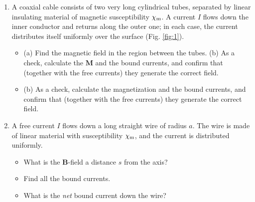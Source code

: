 \documentclass[10pt]{article}
\begin{document}
\begin{enumerate}
\item A coaxial cable consists of two very long cylindrical tubes, separated by linear insulating material of magnetic susceptibility $\chi_{\rm m}$.  A current $I$ flows down the inner conductor and returns along the outer one; in each case, the current distributes itself uniformly over the surface (Fig. \ref{fig:1}).
\begin{itemize}
\item (a) Find the magnetic field in the region between the tubes.  (b) As a check, calculate the $\mathbf{M}$ and the bound currents, and confirm that (together with the free currents) they generate the correct field.  \\ \vspace{4cm}
\item (b) As a check, calculate the magnetization and the bound currents, and confirm that (together with the free currents) they generate the correct field.  \\ \vspace{4cm}
\end{itemize}
\item A free current $I$ flows down a long straight wire of radius $a$.  The wire is made of linear material with susceptibility $\chi_{\rm m}$, and the current is distributed uniformly.
\begin{itemize}
\item What is the $\mathbf{B}$-field a distance $s$ from the axis? \\ \vspace{2cm}
\item Find all the bound currents. \\ \vspace{3cm}
\item What is the \textit{net} bound current down the wire?
\end{itemize}
\end{enumerate}
\end{document}
